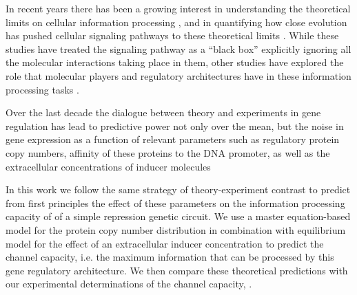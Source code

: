 In recent years there has been a growing interest in understanding the
theoretical limits on cellular information processing \cite{Bialek2005,
Gregor2007}, and in quantifying how close evolution has pushed cellular
signaling pathways to these theoretical limits \cite{Tkacik2008, Dubuis2013,
Petkova2016}. While these studies have treated the signaling pathway as a
``black box'' explicitly ignoring all the molecular interactions taking place in
them, other studies have explored the role that molecular players and regulatory
architectures have in these information processing tasks \cite{Rieckh2014,
Ziv2007, Voliotis2014, Tostevin2009, Tkacik2011, Tkacik2008a, Tabbaa2014}.

Over the last decade the dialogue between theory and experiments in gene
regulation has lead to predictive power not only over the mean, but the noise in
gene expression as a function of relevant parameters such as regulatory protein
copy numbers, affinity of these proteins to the DNA promoter, as well as the
extracellular concentrations of inducer molecules\cite{Jones2014a, Brewster2014,
Garcia2011c} 

In this work we follow the same strategy of theory-experiment contrast to
predict from first principles the effect of these parameters on the information
processing capacity of of a simple repression genetic circuit. We use a master
equation-based model for the protein copy number distribution in combination
with equilibrium model for the effect of an extracellular inducer concentration
to predict the channel capacity, i.e. the maximum information that can be
processed by this gene regulatory architecture. We then compare these
theoretical predictions with our experimental determinations of the channel
capacity, .

